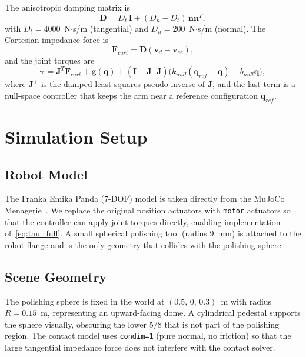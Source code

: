 \documentclass[conference]{IEEEtran}
\newcommand{\vd}{\mathbf{v}_d}
\newcommand{\veeEE}{\mathbf{v}_{ee}}
\newcommand{\nn}{\mathbf{n}}
\newcommand{\qq}{\mathbf{q}}
\newcommand{\JJ}{\mathbf{J}}
\newcommand{\DD}{\mathbf{D}}
\newcommand{\Fc}{\mathbf{F}_{cart}}
\newcommand{\tauv}{\boldsymbol{\tau}}
\begin{document}
The anisotropic damping matrix is
\begin{equation}
  \DD = D_t\,\mathbf{I} + (D_n - D_t)\,\nn\nn^T,
  \label{eq:D}
\end{equation}
with $D_t = 4000$~N$\cdot$s/m (tangential) and $D_n = 200$~N$\cdot$s/m
(normal). The Cartesian impedance force is
\begin{equation}
  \Fc = \DD(\vd - \veeEE),
  \label{eq:Fc}
\end{equation}
and the joint torques are
\begin{equation}
  \tauv = \JJ^T \Fc + \mathbf{g}(\qq) +
          (\mathbf{I} - \JJ^+\JJ)\bigl(k_{null}(\qq_{ref}-\qq) - b_{null}\dot{\qq}\bigr),
  \label{eq:tau_full}
\end{equation}
where $\JJ^+$ is the damped least-squares pseudo-inverse of $\JJ$,
and the last term is a null-space controller that keeps the arm near a
reference configuration $\qq_{ref}$.

\section{Simulation Setup}
\label{sec:sim}

\subsection{Robot Model}

The Franka Emika Panda (7-DOF) model is taken directly from the
MuJoCo Menagerie~\cite{menagerie2022}. We replace the original position
actuators with \texttt{motor} actuators so that the controller can apply
joint torques directly, enabling implementation of~\eqref{eq:tau_full}.
A small spherical polishing tool (radius 9~mm) is attached to the robot
flange and is the only geometry that collides with the polishing sphere.

\subsection{Scene Geometry}

The polishing sphere is fixed in the world at $(0.5,\,0,\,0.3)$~m with
radius $R = 0.15$~m, representing an upward-facing dome. A cylindrical
pedestal supports the sphere visually, obscuring the lower $5/8$ that is
not part of the polishing region. The contact model uses \texttt{condim=1}
(pure normal, no friction) so that the large tangential impedance force does
not interfere with the contact solver.
\end{document}
